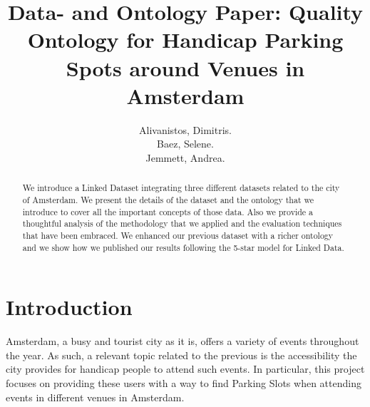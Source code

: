 \documentclass[runningheads,a4paper]{../../StyleFiles/llncs}
\begin{document}
\mainmatter  %

\title{Data- and Ontology Paper: Quality Ontology for Handicap Parking Spots around Venues in Amsterdam}


%
%
\author{Alivanistos, Dimitris. \\ Baez, Selene. \\ Jemmett, Andrea. }
%


\maketitle


\begin{abstract}
We introduce a Linked Dataset integrating three different datasets related to
the city of Amsterdam. We present the details of the dataset and the ontology
that we introduce to cover all the important concepts of those data. Also we
provide a thoughtful analysis of the methodology that we applied and the
evaluation techniques that have been embraced. We enhanced our previous dataset
with a richer ontology and we show how we published our results following the
5-star model for Linked Data.
\end{abstract}


\section{Introduction}
Amsterdam, a busy and tourist city as it is, offers a variety of events throughout the year. As such, a relevant topic related to the previous is the accessibility the city provides for handicap people to attend such events. In particular, this project focuses on providing these users with a way to find Parking Slots when attending events in different venues in Amsterdam.
\end{document}
